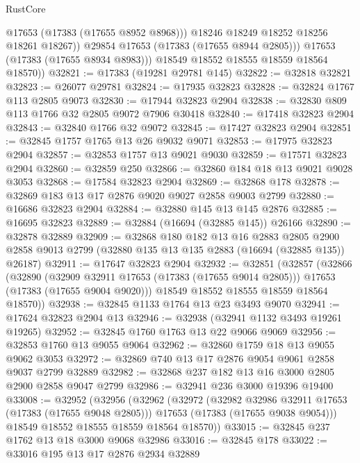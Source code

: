 \begin{lexlean}{RustCore}
\begin{coremodule}
                  @17653
                  (@17383 (@17655 @8952 @8968)))
                @18246
                @18249
                @18252
                @18256
                @18261
                @18267))
            @29854
            @17653
            (@17383 (@17655 @8944 @2805)))
          @17653
          (@17383 (@17655 @8934 @8983)))
        @18549
        @18552
        @18555
        @18559
        @18564
        @18570))
@32821 := @17383 (@19281 @29781 @145)
@32822 := @32818 @32821
@32823 := @26077 @29781
@32824 := @17935 @32823
@32828 := @32824 @1767 @113 @2805 @9073
@32830 := @17944 @32823 @2904
@32838 := @32830 @809 @113 @1766 @32 @2805 @9072 @7906 @30418
@32840 := @17418 @32823 @2904
@32843 := @32840 @1766 @32 @9072
@32845 := @17427 @32823 @2904
@32851 := @32845 @1757 @1765 @13 @26 @9032 @9071
@32853 := @17975 @32823 @2904
@32857 := @32853 @1757 @13 @9021 @9030
@32859 := @17571 @32823 @2904
@32860 := @32859 @250
@32866 := @32860 @184 @18 @13 @9021 @9028 @3053
@32868 := @17584 @32823 @2904
@32869 := @32868 @178
@32878 := @32869 @183 @13 @17 @2876 @9020 @9027 @2858 @9003 @2799
@32880 := @16686 @32823 @2904
@32884 := @32880 @145 @13 @145 @2876
@32885 := @16695 @32823
@32889 := @32884 (@16694 (@32885 @145)) @26166
@32890 := @32878 @32889
@32909 := @32868
    @180
    @182
    @13
    @16
    @2883
    @2805
    @2900
    @2858
    @9013
    @2799
    (@32880 @135 @13 @135 @2883 (@16694 (@32885 @135)) @26187)
@32911 := @17647 @32823 @2904
@32932 := @32851
    (@32857
      (@32866
        (@32890
          (@32909 @32911 @17653 (@17383 (@17655 @9014 @2805)))
          @17653
          (@17383 (@17655 @9004 @9020)))
        @18549
        @18552
        @18555
        @18559
        @18564
        @18570))
@32938 := @32845 @1133 @1764 @13 @23 @3493 @9070
@32941 := @17624 @32823 @2904 @13
@32946 := @32938 (@32941 @1132 @3493 @19261 @19265)
@32952 := @32845 @1760 @1763 @13 @22 @9066 @9069
@32956 := @32853 @1760 @13 @9055 @9064
@32962 := @32860 @1759 @18 @13 @9055 @9062 @3053
@32972 := @32869 @740 @13 @17 @2876 @9054 @9061 @2858 @9037 @2799 @32889
@32982 := @32868 @237 @182 @13 @16 @3000 @2805 @2900 @2858 @9047 @2799
@32986 := @32941 @236 @3000 @19396 @19400
@33008 := @32952
    (@32956
      (@32962
        (@32972
          (@32982 @32986 @32911 @17653 (@17383 (@17655 @9048 @2805)))
          @17653
          (@17383 (@17655 @9038 @9054)))
        @18549
        @18552
        @18555
        @18559
        @18564
        @18570))
@33015 := @32845 @237 @1762 @13 @18 @3000 @9068 @32986
@33016 := @32845 @178
@33022 := @33016 @195 @13 @17 @2876 @2934 @32889

\end{coremodule}
\end{lexlean}
